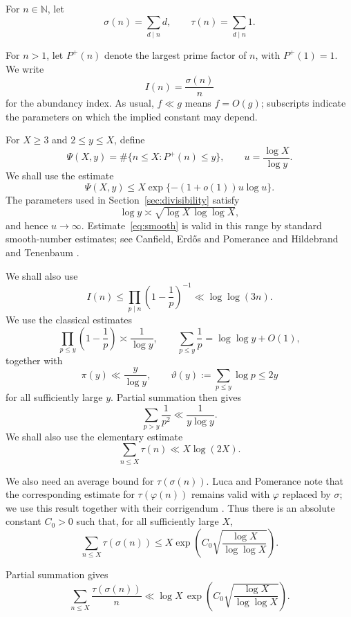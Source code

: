 \documentclass[11pt,reqno]{amsart}
\numberwithin{equation}{section}
\theoremstyle{plain}
\theoremstyle{definition}
\theoremstyle{remark}
\begin{document}
For $n\in\mathbb N$, let
\[
\sigma(n)=\sum_{d\mid n}d,
\qquad
\tau(n)=\sum_{d\mid n}1.
\]

For $n>1$, let $P^+(n)$ denote the largest prime factor of $n$, with $P^+(1)=1$. We write
\[
I(n)=\frac{\sigma(n)}{n}
\]
for the abundancy index. As usual, $f\ll g$ means $f=O(g)$; subscripts indicate the parameters on which the implied constant may depend.

For $X\ge3$ and $2\le y\le X$, define
\[
\Psi(X,y)=\#\{n\le X:P^+(n)\le y\},
\qquad
u=\frac{\log X}{\log y}.
\]
We shall use the estimate
\begin{equation}
\Psi(X,y)
\le
X\exp\{-(1+o(1))u\log u\}.
\label{eq:smooth}
\end{equation}
The parameters used in Section~\ref{sec:divisibility} satisfy
\[
\log y\asymp\sqrt{\log X\,\log\log X},
\]
and hence $u\to\infty$. Estimate~\eqref{eq:smooth} is valid in this range by standard smooth-number estimates; see Canfield, Erd\H{o}s and Pomerance
\cite{CanfieldErdosPomerance1983} and Hildebrand and Tenenbaum
\cite[Corollary~1.3]{HildebrandTenenbaum1993}.

We shall also use
\begin{equation}
I(n)
\le
\prod_{p\mid n}
\left(1-\frac1p\right)^{-1}
\ll
\log\log(3n).
\label{eq:abundancy-bound}
\end{equation}
We use the classical estimates
\[
\prod_{p\le y}\left(1-\frac1p\right)\asymp\frac1{\log y},
\qquad
\sum_{p\le y}\frac1p=\log\log y+O(1),
\]
together with
\[
\pi(y)\ll\frac{y}{\log y},
\qquad
\vartheta(y):=\sum_{p\le y}\log p\le2y
\]
for all sufficiently large $y$. Partial summation then gives
\[
\sum_{p>y}\frac1{p^2}\ll\frac1{y\log y}.
\]
We shall also use the elementary estimate
\[
\sum_{n\le X}\tau(n)\ll X\log(2X).
\]

We also need an average bound for $\tau(\sigma(n))$. Luca and Pomerance note that the corresponding estimate for $\tau(\varphi(n))$ remains valid with $\varphi$ replaced by $\sigma$; we use this result together with their corrigendum
\cite{LucaPomerance2007,LucaPomeranceCorr2016}.
Thus there is an absolute constant $C_0>0$ such that, for all sufficiently large $X$,
\begin{equation}
\sum_{n\le X}\tau(\sigma(n))
\le
X\exp\left(
C_0\sqrt{\frac{\log X}{\log\log X}}
\right).
\label{eq:luca-pomerance}
\end{equation}

Partial summation gives
\begin{equation}
\sum_{n\le X}\frac{\tau(\sigma(n))}{n}
\ll
\log X\,
\exp\left(
C_0\sqrt{\frac{\log X}{\log\log X}}
\right).
\label{eq:partial-sum-tau-sigma}
\end{equation}
\end{document}
